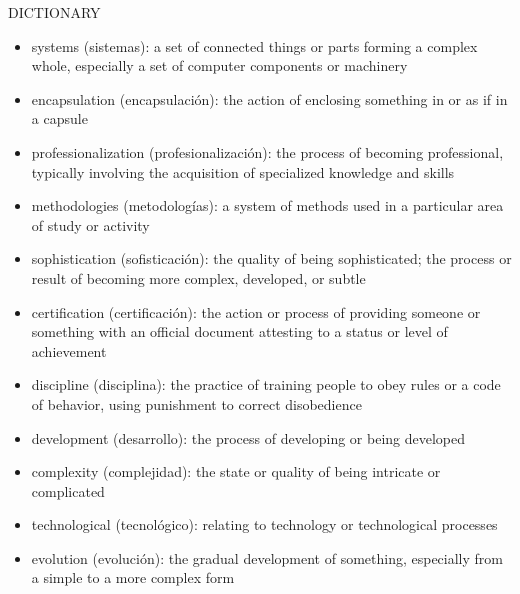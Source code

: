 \documentclass{article}
\begin{document}
\begin{table}[H]
\centering
\begin{minipage}{0.8\textwidth} %
         DICTIONARY
    \begin{itemize}
        \item systems (sistemas): a set of connected things or parts forming a complex whole, especially a set of computer components or machinery
        \item encapsulation (encapsulación): the action of enclosing something in or as if in a capsule
        \item professionalization (profesionalización): the process of becoming professional, typically involving the acquisition of specialized knowledge and skills
        \item methodologies (metodologías): a system of methods used in a particular area of study or activity
        \item sophistication (sofisticación): the quality of being sophisticated; the process or result of becoming more complex, developed, or subtle
        \item certification (certificación): the action or process of providing someone or something with an official document attesting to a status or level of achievement
        \item discipline (disciplina): the practice of training people to obey rules or a code of behavior, using punishment to correct disobedience
        \item development (desarrollo): the process of developing or being developed
        \item complexity (complejidad): the state or quality of being intricate or complicated
        \item technological (tecnológico): relating to technology or technological processes
        \item evolution (evolución): the gradual development of something, especially from a simple to a more complex form
    \end{itemize}
\end{minipage}
\end{table}
\end{document}
